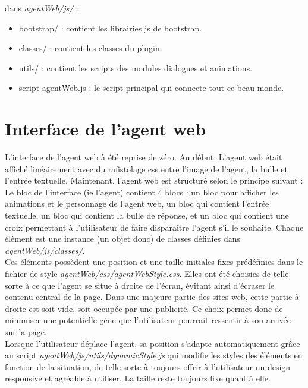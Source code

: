 \documentclass[11pt,dvipsnames,svgnames]{report}
\begin{document}
	
	dans \emph{agentWeb/js/} : \\
	
	\begin{itemize}
	\item bootstrap/ : contient les librairies js de bootstrap.
	\item classes/ : contient les classes du plugin.
	\item utils/ : contient les scripts des modules dialogues et animations.
	\item script-agentWeb.js : le script-principal qui connecte tout ce beau monde.\\
	\end{itemize}
	
	\section{Interface de l'agent web}
	
	L'interface de l'agent web à été reprise de zéro. Au début, L'agent web était affiché linéairement avec du rafistolage css entre l'image de l'agent, la bulle et l'entrée textuelle. Maintenant, l'agent web est structuré selon le principe suivant : \\
	
	Le bloc de l'interface (ie l'agent) contient 4 blocs : un bloc pour afficher les animations et le personnage de l'agent web, un bloc qui contient l'entrée textuelle, un bloc qui contient la bulle de réponse, et un bloc qui contient une croix permettant à l'utilisateur de faire disparaître l'agent s'il le souhaite. Chaque élément est une instance (un objet donc) de classes définies dans \emph{agentWeb/js/classes/}.\\
	
	Ces éléments possèdent une position et une taille initiales fixes prédéfinies dans le fichier de style   \emph{agentWeb/css/agentWebStyle.css}. Elles ont été choisies de telle sorte à ce que l'agent se situe à droite de l'écran, évitant ainsi d'écraser le contenu central de la page. Dans une majeure partie des sites web, cette partie à droite est soit vide, soit occupée par une publicité. Ce choix permet donc de minimiser une potentielle gène que l'utilisateur pourrait ressentir à son arrivée sur la page.\\
	
	Lorsque l'utilisateur déplace l'agent, sa position s'adapte automatiquement grâce au script \emph{agentWeb/js/utils/dynamicStyle.js} qui modifie les styles des éléments en fonction de la situation, de telle sorte à toujours offrir à l'utilisateur un design responsive et agréable à utiliser. La taille reste toujours fixe quant à elle.\\
	
\end{document}
